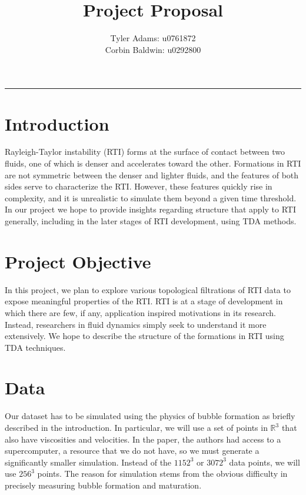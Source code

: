 \documentclass[12pt, fullpage,letterpaper]{article}
\title{Project Proposal}
\author{Tyler Adams: u0761872 \\Corbin Baldwin: u0292800}
\begin{document}
	\maketitle 
	\hrule 
	\vskip 0.5cm
	\section*{\normalfont Introduction}
	Rayleigh-Taylor instability (RTI) forms at the surface of contact between two fluids, one of which is denser and accelerates toward the other. Formations in RTI are not symmetric between the denser and lighter fluids, and the features of both sides serve to characterize the RTI. However, these features quickly rise in complexity, and it is unrealistic to simulate them beyond a given time threshold. In our project we hope to provide insights regarding structure that apply to RTI generally, including in the later stages of RTI development, using TDA methods.
  
	\section*{\normalfont Project Objective}  
	In this project, we plan to explore various topological filtrations of RTI data to expose meaningful properties of the RTI. RTI is at a stage of development in which there are few, if any, application inspired motivations in its research. Instead, researchers in fluid dynamics simply seek to understand it more extensively. We hope to describe the structure of the formations in RTI using TDA techniques.
	
	\section*{\normalfont Data} 

	Our dataset has to be simulated using the physics of bubble formation as briefly described in the introduction. In particular, we will use a set of points in $\mathbb{R}^3$ that also have viscosities and velocities. In the paper, the authors had access to a supercomputer, a resource that we do not have, so we must generate a significantly smaller simulation. Instead of the $1152^3$ or $3072^3$ data points, we will use $256^3$ points. The reason for simulation stems from the obvious difficulty in precisely measuring bubble formation and maturation.
	
\end{document}
